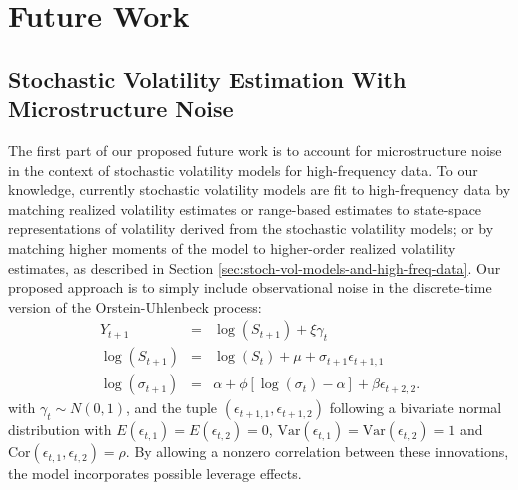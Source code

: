 \chapter{Future Work} \label{chapter:4}

\section{Stochastic Volatility Estimation With Microstructure Noise} \label{sec:stoch-vol-microstructure-noise}
The first part of our proposed future work is to account for microstructure noise in the context of stochastic volatility models for high-frequency data. To our knowledge, currently stochastic volatility models are fit to high-frequency data by matching realized volatility estimates or range-based estimates to state-space representations of volatility derived from the stochastic volatility models; or by matching higher moments of the model to higher-order realized volatility estimates, as described in Section \ref{sec:stoch-vol-models-and-high-freq-data}. Our proposed approach is to simply include observational noise in the discrete-time version of the Orstein-Uhlenbeck process: 
\begin{eqnarray*}
	Y_{t+1} &=& \log(S_{t+1}) + \xi\gamma_{t} \\
	\log(S_{t+1}) &=& \log(S_{t}) + \mu + \sigma_{t+1} \epsilon_{t+1,1} \\
	\log(\sigma_{t+1}) &=& \alpha + \phi[ \log(\sigma_{t}) - \alpha] + \beta\epsilon_{t+2,2}.
\end{eqnarray*}
with $\gamma_t \sim N(0, 1)$, and the tuple $(\epsilon_{t+1,1}, \epsilon_{t+1,2})$ following a bivariate normal distribution with $E(\epsilon_{t,1}) = E(\epsilon_{t,2}) = 0$, $\mbox{Var}(\epsilon_{t,1}) = \mbox{Var}(\epsilon_{t,2}) = 1$ and $\mbox{Cor}(\epsilon_{t,1}, \epsilon_{t,2}) = \rho$. By allowing a nonzero correlation between these innovations, the model incorporates possible leverage effects.

